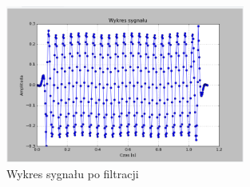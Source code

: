 \documentclass{article}
\begin{document}
{{            \begin{figure}[h!]
                \centering
                \includegraphics[width=0.7\textwidth]{img/fil26.png}
                \caption{Wykres sygnału po filtracji}
            \end{figure}
            \FloatBarrier
        }
        \newpage
    
    }
\end{document}
